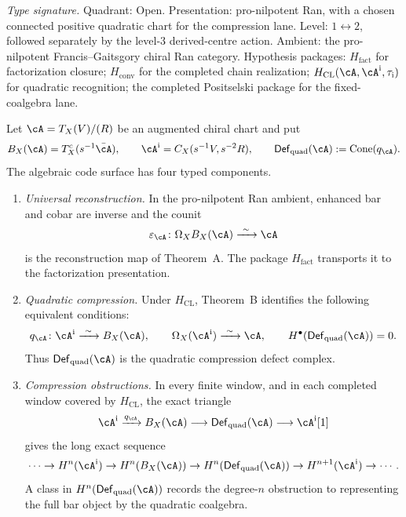 \begin{proposition}
\label{prop:thqg-barcobar-error-correction}
\textit{Type signature.}
Quadrant: Open.  Presentation: pro-nilpotent Ran, with a chosen
connected positive quadratic chart for the compression lane.
Level: $1\leftrightarrow2$, followed separately by the level-$3$
derived-centre action.  Ambient: the pro-nilpotent
Francis--Gaitsgory chiral Ran category.  Hypothesis packages:
$H_{\mathrm{fact}}$ for factorization closure;
$H_{\mathrm{conv}}$ for the completed chain realization;
$H_{\mathrm{CL}}(\cA,\cA^{\mathrm i},\tau_{\mathrm i})$ for
quadratic recognition; the completed Positselski package for the
fixed-coalgebra lane.

\medskip
Let $\cA=T_X(V)/(R)$ be an augmented chiral chart and put
\[
 B_X(\cA)=T_X^c(s^{-1}\bar\cA),
 \qquad
 \cA^{\mathrm i}=C_X(s^{-1}V,s^{-2}R),
 \qquad
 \mathsf{Def}_{\mathrm{quad}}(\cA)
 :=\operatorname{Cone}(q_\cA).
\]
The algebraic code surface has four typed components.
\begin{enumerate}[label=\textup{(\roman*)}]
\item \emph{Universal reconstruction.}
 In the pro-nilpotent Ran ambient, enhanced bar and cobar are inverse
 and the counit
 \[
 \varepsilon_\cA\colon\Omega_XB_X(\cA)
 \xrightarrow{\ \sim\ }\cA
 \]
 is the reconstruction map of Theorem~A.  The package
 $H_{\mathrm{fact}}$ transports it to the factorization presentation.

\item \emph{Quadratic compression.}
 Under $H_{\mathrm{CL}}$, Theorem~B identifies the following
 equivalent conditions:
 \[
 q_\cA\colon\cA^{\mathrm i}\xrightarrow{\ \sim\ }B_X(\cA),
 \qquad
 \Omega_X(\cA^{\mathrm i})\xrightarrow{\ \sim\ }\cA,
 \qquad
 H^\bullet\!\left(\mathsf{Def}_{\mathrm{quad}}(\cA)\right)=0.
 \]
 Thus $\mathsf{Def}_{\mathrm{quad}}(\cA)$ is the quadratic
 compression defect complex.

\item \emph{Compression obstructions.}
 In every finite window, and in each completed window covered by
 $H_{\mathrm{CL}}$, the exact triangle
 \[
 \cA^{\mathrm i}\xrightarrow{q_\cA}B_X(\cA)
 \longrightarrow\mathsf{Def}_{\mathrm{quad}}(\cA)
 \longrightarrow\cA^{\mathrm i}[1]
 \]
 gives the long exact sequence
 \[
 \cdots\to H^n(\cA^{\mathrm i})\to H^n(B_X(\cA))
 \to H^n\!\left(\mathsf{Def}_{\mathrm{quad}}(\cA)\right)
 \to H^{n+1}(\cA^{\mathrm i})\to\cdots .
 \]
 A class in
 $H^n\!\left(\mathsf{Def}_{\mathrm{quad}}(\cA)\right)$ records the
 degree-$n$ obstruction to
 representing the full bar object by the quadratic coalgebra.


\end{enumerate}
\end{proposition}
